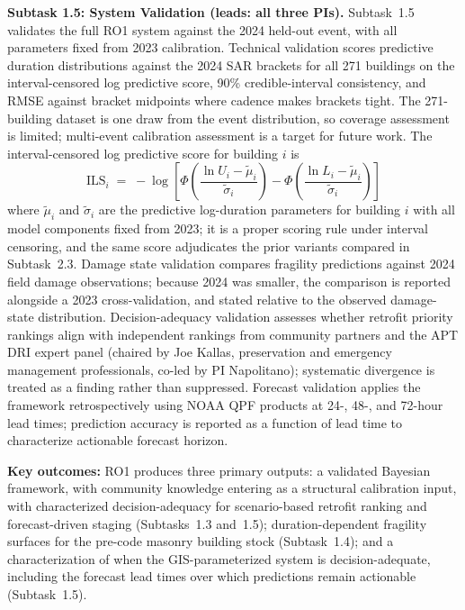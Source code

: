 \documentclass[11pt]{article}
\begin{document}
\textbf{Subtask 1.5: System Validation (leads: all three PIs).}
Subtask~1.5 validates the full RO1 system against the 2024 held-out event, with
all parameters fixed from 2023 calibration.
Technical validation scores predictive duration distributions against the 2024 SAR
brackets for all 271 buildings on the interval-censored log predictive score,
90\% credible-interval consistency, and RMSE against bracket midpoints where
cadence makes brackets tight. The 271-building dataset is one draw from
the event distribution, so coverage assessment is limited; multi-event
calibration assessment is a target for future work.
The interval-censored log predictive score for building $i$ is
\begin{equation}\label{eq:lps}
  \mathrm{ILS}_i \;=\; -\log\!\left[
    \Phi\!\left(\frac{\ln U_i - \tilde{\mu}_i}{\tilde{\sigma}_i}\right) -
    \Phi\!\left(\frac{\ln L_i - \tilde{\mu}_i}{\tilde{\sigma}_i}\right)\right]
\end{equation}
where $\tilde{\mu}_i$ and $\tilde{\sigma}_i$ are the predictive log-duration
parameters for building $i$ with all model components fixed from 2023; it is a
proper scoring rule under interval censoring, and the same score adjudicates the
prior variants compared in Subtask~2.3.
Damage state validation compares fragility predictions against 2024 field damage
observations; because 2024 was smaller, the comparison is reported alongside a
2023 cross-validation, and stated relative to the observed damage-state
distribution.
Decision-adequacy validation assesses whether retrofit priority rankings align
with independent rankings from community partners and the APT DRI expert panel
(chaired by Joe Kallas, preservation and emergency management professionals, co-led by PI Napolitano);
systematic divergence is treated as a finding rather than suppressed.
Forecast validation applies the framework retrospectively using NOAA QPF products
at 24-, 48-, and 72-hour lead times; prediction accuracy is reported as a function
of lead time to characterize actionable forecast horizon.


\textbf{Key outcomes:} RO1 produces three primary outputs: a validated Bayesian framework, with community knowledge entering as a structural calibration input, with characterized decision-adequacy for scenario-based retrofit ranking and forecast-driven staging (Subtasks~1.3 and~1.5); duration-dependent fragility surfaces for the pre-code masonry building stock (Subtask~1.4); and a characterization of when the GIS-parameterized system is decision-adequate, including the forecast lead times over which predictions remain actionable (Subtask~1.5).
\end{document}
